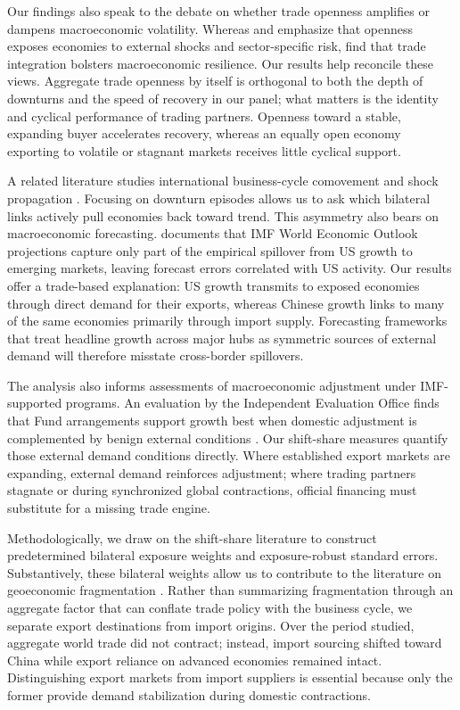 \documentclass[12pt, a4paper]{article}
\begin{document}
Our findings also speak to the debate on whether trade openness amplifies or dampens macroeconomic volatility. Whereas \citet{rodrik1998} and \citet{digiovanni2009} emphasize that openness exposes economies to external shocks and sector-specific risk, \citet{eichengreen2024} find that trade integration bolsters macroeconomic resilience. Our results help reconcile these views. Aggregate trade openness by itself is orthogonal to both the depth of downturns and the speed of recovery in our panel; what matters is the identity and cyclical performance of trading partners. Openness toward a stable, expanding buyer accelerates recovery, whereas an equally open economy exporting to volatile or stagnant markets receives little cyclical support.

A related literature studies international business-cycle comovement and shock propagation \citep{kose2003, ciccarelli2010}. Focusing on downturn episodes allows us to ask which bilateral links actively pull economies back toward trend. This asymmetry also bears on macroeconomic forecasting. \citet{sholomytskyi2026} documents that IMF World Economic Outlook projections capture only part of the empirical spillover from US growth to emerging markets, leaving forecast errors correlated with US activity. Our results offer a trade-based explanation: US growth transmits to exposed economies through direct demand for their exports, whereas Chinese growth links to many of the same economies primarily through import supply. Forecasting frameworks that treat headline growth across major hubs as symmetric sources of external demand will therefore misstate cross-border spillovers.

The analysis also informs assessments of macroeconomic adjustment under IMF-supported programs. An evaluation by the Independent Evaluation Office finds that Fund arrangements support growth best when domestic adjustment is complemented by benign external conditions \citep{ieo2021}. Our shift-share measures quantify those external demand conditions directly. Where established export markets are expanding, external demand reinforces adjustment; where trading partners stagnate or during synchronized global contractions, official financing must substitute for a missing trade engine.

Methodologically, we draw on the shift-share literature \citep{adao2019, goldsmith2020, borusyak2022} to construct predetermined bilateral exposure weights and exposure-robust standard errors. Substantively, these bilateral weights allow us to contribute to the literature on geoeconomic fragmentation \citep{aiyar2023, gopinath2024, fv2024}. Rather than summarizing fragmentation through an aggregate factor that can conflate trade policy with the business cycle, we separate export destinations from import origins. Over the period studied, aggregate world trade did not contract; instead, import sourcing shifted toward China while export reliance on advanced economies remained intact. Distinguishing export markets from import suppliers is essential because only the former provide demand stabilization during domestic contractions.
\end{document}

